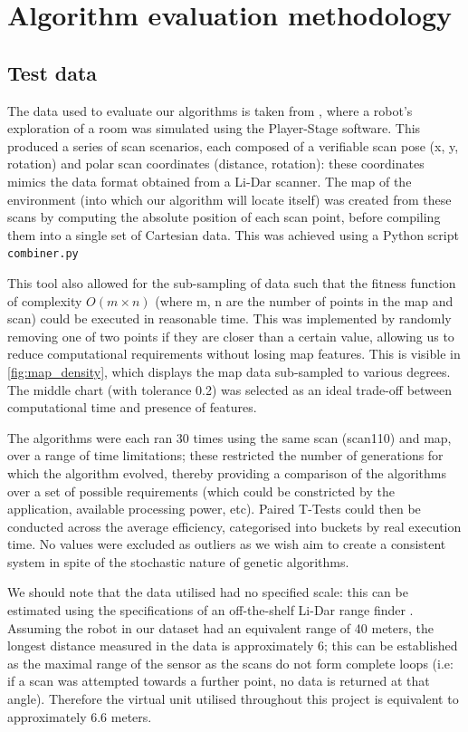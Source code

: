 \documentclass[authoryearcitations]{UoYCSproject}
\begin{document}
\chapter{Algorithm evaluation methodology}
\label{cha:system_design}


\section{Test data}
The data used to evaluate our algorithms is taken from \citet{Lenac2011-co}, where a robot's exploration of a room was simulated using the Player-Stage software. This produced a series of scan scenarios, each composed of a verifiable scan pose (x, y, rotation) and polar scan coordinates (distance, rotation): these coordinates mimics the data format obtained from a Li-Dar scanner. The map of the environment (into which our algorithm will locate itself) was created from these scans by computing the absolute position of each scan point, before compiling them into a single set of Cartesian data. This was achieved using a Python script \lstinline{combiner.py} 


This tool also allowed for the sub-sampling of data such that the fitness function of complexity $O(m\times n)$  (where m, n are the number of points in the map and scan) could be executed in reasonable time. This was implemented by randomly removing one of two points if they are closer than a certain value, allowing us to reduce computational requirements without losing map features. This is visible in \autoref{fig:map_density}, which displays the map data sub-sampled to various degrees. The middle chart (with tolerance 0.2) was selected as an ideal trade-off between computational time and presence of features.

The algorithms were each ran 30 times using the same scan (scan110) and map, over a range of time limitations; these restricted the number of generations for which the algorithm evolved, thereby providing a comparison of the algorithms over a set of possible requirements (which could be constricted by the application, available processing power, etc). Paired T-Tests could then be conducted across the average efficiency, categorised into buckets by real execution time. No values were excluded as outliers  as we wish aim to create a consistent system in spite of the stochastic nature of genetic algorithms.

We should note that the data utilised had no specified scale: this can be estimated using the specifications of an off-the-shelf Li-Dar range finder \cite{noauthor_undated-bu}. Assuming the robot in our dataset had an equivalent range of 40 meters, the longest distance measured in the data is approximately 6; this can be established as the maximal range of the sensor as the scans do not form complete loops (i.e: if a scan was attempted towards a further point, no data is returned at that angle). Therefore the virtual unit utilised throughout this project is equivalent to approximately 6.6 meters. 
\end{document}
